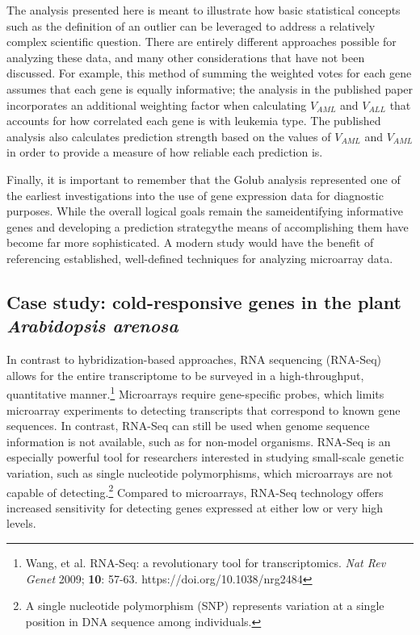 The analysis presented here is meant to illustrate how basic statistical concepts such as the definition of an outlier can be leveraged to address a relatively complex scientific question. There are entirely different approaches possible for analyzing these data, and many other considerations that have not been discussed. For example, this method of summing the weighted votes for each gene assumes that each gene is equally informative; the analysis in the published paper incorporates an additional weighting factor when calculating $V_{AML}$ and $V_{ALL}$ that accounts for how correlated each gene is with leukemia type. The published analysis also calculates prediction strength based on the values of $V_{AML}$ and $V_{AML}$ in order to provide a measure of how reliable each prediction is. 

\textD{\newpage}

Finally, it is important to remember that the Golub analysis represented one of the earliest investigations into the use of gene expression data for diagnostic purposes. While the overall logical goals remain the same\textemdash identifying informative genes and developing a prediction strategy\textemdash the means of accomplishing them have become far more sophisticated. A modern study would have the benefit of referencing established, well-defined techniques for analyzing microarray data.



\subsection{Case study: cold-responsive genes in the plant \textit{Arabidopsis arenosa}}

In contrast to hybridization-based approaches, RNA sequencing (RNA-Seq) allows for the entire transcriptome to be surveyed in a high-throughput, quantitative manner.\footnote{Wang, et al. RNA-Seq: a revolutionary tool for transcriptomics. \textit{Nat Rev Genet} 2009; \textbf{10}: 57-63.  https://doi.org/10.1038/nrg2484} Microarrays require gene-specific probes, which limits microarray experiments to detecting transcripts that correspond to known gene sequences. In contrast, RNA-Seq can still be used when genome sequence information is not available, such as for non-model organisms. RNA-Seq is an especially powerful tool for researchers interested in studying small-scale genetic variation, such as single nucleotide polymorphisms, which microarrays are not capable of detecting.\footnote{A single nucleotide polymorphism (SNP) represents variation at a single position in DNA sequence among individuals.} Compared to microarrays, RNA-Seq technology offers increased sensitivity for detecting genes expressed at either low or very high levels.

